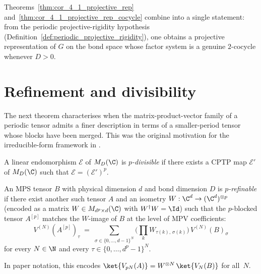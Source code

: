 \begin{theorem}%
    \label{thm:projectiveRep_of_symmetry}
    \leanok
    Theorems~\ref{thm:cor_4_1_projective_rep}
    and~\ref{thm:cor_4_1_projective_rep_cocycle} combine into a
    single statement: from the periodic projective-rigidity
    hypothesis (Definition~\ref{def:periodic_projective_rigidity}), one
    obtains a projective representation of $G$ on the bond space whose
    factor system is a genuine $2$-cocycle whenever $D > 0$.
\end{theorem}

\section{Refinement and divisibility}\label{sec:periodic_refinement}

The next theorem characterises when the matrix-product-vector family of a
periodic tensor admits a finer description in terms of a smaller-period
tensor whose blocks have been merged.  This was the original motivation
for the irreducible-form framework in \cite{DeLasCuevas2017Irreducible}.

\begin{definition}
    \label{def:p_divisible_channel}
    \leanok
    A linear endomorphism $\mathcal{E}$ of $M_D(\C)$ is \emph{$p$-divisible}
    if there exists a CPTP map $\mathcal{E}'$ of $M_D(\C)$ such that
    $\mathcal{E} = (\mathcal{E}')^p$.
\end{definition}

\begin{definition}
    \label{def:p_refinable}
    \leanok
    An MPS tensor $B$ with physical dimension $d$ and bond dimension $D$ is
    \emph{$p$-refinable} if there exist another such tensor $A$ and an
    isometry $W : \C^d \to (\C^d)^{\otimes p}$ (encoded as a matrix
    $W \in M_{d^p \times d}(\C)$ with $W^{\dagger} W = \Id$) such that the
    $p$-blocked tensor $A^{[p]}$ matches the $W$-image of $B$ at the level
    of MPV coefficients:
    \[
        V^{(N)}(A^{[p]})_\tau
        \;=\;
        \sum_{\sigma \in \{0,\ldots,d-1\}^N}
            \Big(\prod_{k} W_{\tau(k),\,\sigma(k)}\Big)\,
            V^{(N)}(B)_\sigma
    \]
    for every $N \in \N$ and every
    $\tau \in \{0,\ldots,d^p-1\}^N$.

    In paper notation, this encodes
    $\ket{V_{pN}(A)} = W^{\otimes N}\, \ket{V_N(B)}$ for all~$N$.
\end{definition}

